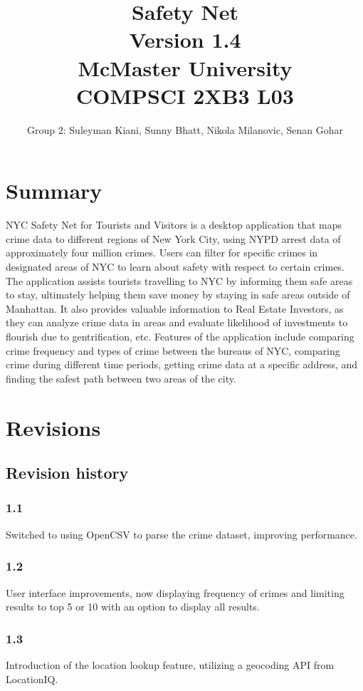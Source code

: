 \documentclass[12pt]{article}
\title{\huge{Safety Net} \\ \vspace{3mm} \large{Version 1.4} \\ \vspace{3mm} McMaster University \\ COMPSCI 2XB3 L03}
\author{Group 2: Suleyman Kiani, Sunny Bhatt, Nikola Milanovic, Senan Gohar}
\begin{document}
\maketitle
\vspace{5mm}
\section*{Summary}
NYC Safety Net for Tourists and Visitors is a desktop application that maps crime data to
different regions of New York City, using NYPD arrest data of approximately four million crimes. Users can filter
for specific crimes in designated areas of NYC to learn about safety with respect to certain crimes. The
application assists tourists travelling to NYC by informing them safe areas to stay, ultimately helping them
save money by staying in safe areas outside of Manhattan. It also provides valuable information to Real Estate
Investors, as they can analyze crime data in areas and evaluate likelihood of investments to flourish due
to gentrification, etc. Features of the application include comparing crime frequency and types of crime
between the bureaus of NYC, comparing crime during different time periods, getting crime data at
a specific address, and finding the safest path between two areas of the city.

\newpage

\section* {Revisions}
\subsection*{Revision history}
\subsubsection*{1.1}
Switched to using OpenCSV to parse the crime dataset, improving performance.
\subsubsection*{1.2}
User interface improvements, now displaying frequency of crimes and limiting results to top 5 or 10 with an option to display all results.
\subsubsection*{1.3}
Introduction of the location lookup feature, utilizing a geocoding API from LocationIQ.
\end{document}
